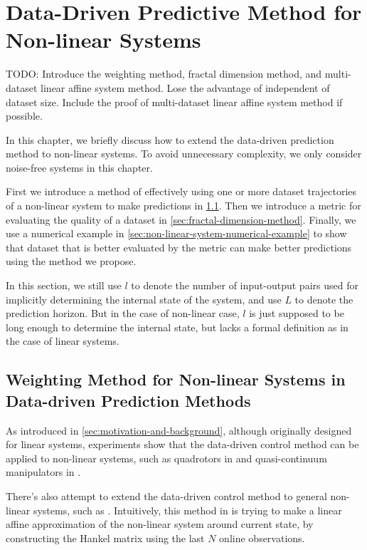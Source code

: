\chapter{Data-Driven Predictive Method for Non-linear Systems}\label{chap:non-linear-system}
TODO: Introduce the weighting method, fractal dimension method, and multi-dataset linear affine system method.
Lose the advantage of independent of dataset size.
Include the proof of multi-dataset linear affine system method if possible.

In this chapter, we briefly discuss how to extend the data-driven prediction method to non-linear systems.
To avoid unnecessary complexity, we only consider noise-free systems in this chapter.

First we introduce a method of effectively using one or more dataset trajectories of a non-linear system to make predictions in \cref{sec:weighting-method}.
Then we introduce a metric for evaluating the quality of a dataset in \cref{sec:fractal-dimension-method}.
Finally, we use a numerical example in \cref{sec:non-linear-system-numerical-example} to show that dataset that is better evaluated by the metric can make better predictions using the method we propose.

In this section, we still use $l$ to denote the number of input-output pairs used for implicitly determining the internal state of the system, and use $L$ to denote the prediction horizon.
But in the case of non-linear case, $l$ is just supposed to be long enough to determine the internal state, but lacks a formal definition as in the case of linear systems.


\section{Weighting Method for Non-linear Systems in Data-driven Prediction Methods}\label{sec:weighting-method}

As introduced in \cref{sec:motivation-and-background}, although originally designed for linear systems, experiments show that the data-driven control method can be applied to non-linear systems, such as quadrotors in \cite{elokdaDataQuad2021} and quasi-continuum manipulators in \cite{mullerDataDrivenQCR2022}.

There's also attempt to extend the data-driven control method to general non-linear systems, such as \cite{berberichLinearTrackingMPCData2022}.
Intuitively, this method in \cite{berberichLinearTrackingMPCData2022} is trying to make a linear affine approximation of the non-linear system around current state, by constructing the Hankel matrix using the last $N$ online observations.

